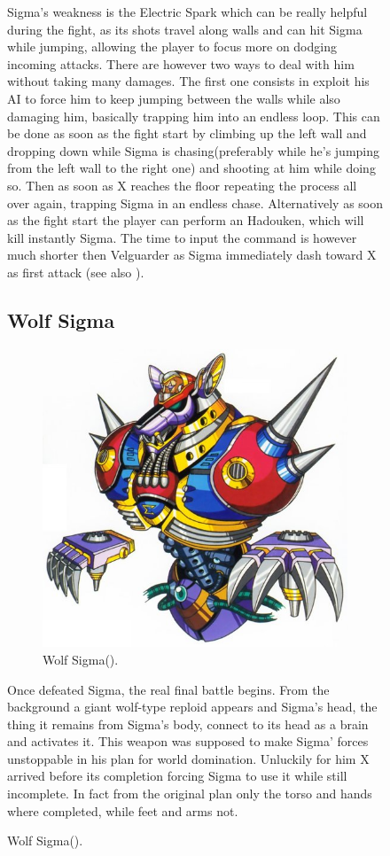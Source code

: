 \begin{figure}[htp]
Sigma's weakness is the Electric Spark which can be really helpful during the fight, as its shots travel along walls and can hit Sigma while jumping, allowing the player to focus more on dodging incoming attacks. There are however two ways to deal with him  without taking many damages. The first one consists in exploit his AI to force him to keep jumping between the walls while also damaging him, basically trapping him into an endless loop. This can be done as soon as the fight start by climbing up the left wall and dropping down while Sigma is chasing(preferably while he's jumping from the left wall to the right one) and shooting at him while doing so. Then as soon as X reaches the floor repeating the process all over again, trapping Sigma in an endless chase. Alternatively as soon as the fight start the player can perform an Hadouken, which will kill instantly Sigma. The time to input the command is however much shorter then Velguarder as Sigma immediately dash toward X as first attack (see also ).


\subsection{Wolf Sigma}\label{boss:wolf_sigma}
\begin{figure}[htp]
	\centering
	\includegraphics[width=0.4\linewidth]{figures/X1/Sigma_stages/WolfSigma.jpg}
	\caption{Wolf Sigma(\cite{book:MMX_Complete_art}).}
\end{figure}
Once defeated Sigma, the real final battle begins. From the background a giant wolf-type reploid appears and Sigma's head, the thing it remains from Sigma's body, connect to its head as a brain and activates it. This weapon was supposed to make Sigma' forces unstoppable in his plan for world domination. Unluckily for him X arrived before its completion forcing Sigma to use it while still incomplete. In fact from the original plan only the torso and hands where completed, while feet and arms not\cite{wayback:X_resources}.


\end{figure}
